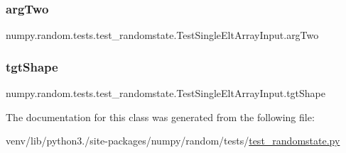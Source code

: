 \subsubsection{\texorpdfstring{arg\+Two}{argTwo}}
{\footnotesize\ttfamily numpy.\+random.\+tests.\+test\+\_\+randomstate.\+Test\+Single\+Elt\+Array\+Input.\+arg\+Two}

\mbox{\label{classnumpy_1_1random_1_1tests_1_1test__randomstate_1_1TestSingleEltArrayInput_a68783ed21979f20df20cd953a8e3f984}} 
\subsubsection{\texorpdfstring{tgt\+Shape}{tgtShape}}
{\footnotesize\ttfamily numpy.\+random.\+tests.\+test\+\_\+randomstate.\+Test\+Single\+Elt\+Array\+Input.\+tgt\+Shape}



The documentation for this class was generated from the following file\+:\begin{DoxyCompactItemize}
\item 
venv/lib/python3./site-\/packages/numpy/random/tests/\hyperlink{test__randomstate_8py}{test\+\_\+randomstate.\+py}\end{DoxyCompactItemize}
